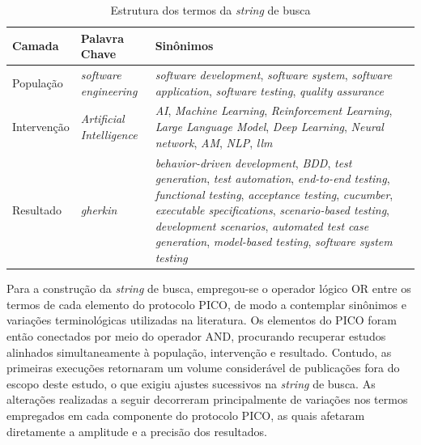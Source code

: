 \begin{table}[H]
\caption{Estrutura dos termos da \textit{string} de busca}
    \begin{tabular}{|p{2.5cm}|p{4cm}|p{8.15cm}|}
        \hline
        \textbf{Camada} & \textbf{Palavra Chave} & \textbf{Sinônimos} \\ \hline

        População 
        & \textit{software engineering} 
        & \textit{software development}, \textit{software system}, \textit{software application}, 
        \textit{software testing}, \textit{quality assurance} \\ \hline

        Intervenção 
        & \textit{Artificial Intelligence} 
        & \textit{AI}, \textit{Machine Learning}, \textit{Reinforcement Learning}, \textit{Large Language Model}, 
        \textit{Deep Learning}, \textit{Neural network}, \textit{AM}, \textit{NLP}, \textit{llm} \\ \hline

        Resultado 
        & \textit{gherkin} 
        & \textit{behavior-driven development}, \textit{BDD}, \textit{test generation}, 
        \textit{test automation}, \textit{end-to-end testing}, \textit{functional testing},
        \textit{acceptance testing}, \textit{cucumber}, \textit{executable specifications},
        \textit{scenario-based testing}, \textit{development scenarios}, 
        \textit{automated test case generation}, \textit{model-based testing}, 
        \textit{software system testing} \\ \hline

    \end{tabular}

    \begin{center}
    \end{center}

\label{tab:string-busca}
\end{table}



Para a construção da \textit{string} de busca, empregou-se o operador lógico OR entre os termos de cada elemento do protocolo PICO, de modo a contemplar sinônimos e variações terminológicas utilizadas na literatura. Os elementos do PICO foram então conectados por meio do operador AND, procurando recuperar estudos alinhados simultaneamente à população, intervenção e resultado. Contudo, as primeiras execuções retornaram um volume considerável de publicações fora do escopo deste estudo, o que exigiu ajustes sucessivos na \textit{string} de busca. As alterações realizadas a seguir decorreram principalmente de variações nos termos empregados em cada componente do protocolo PICO, as quais afetaram diretamente a amplitude e a precisão dos resultados.


